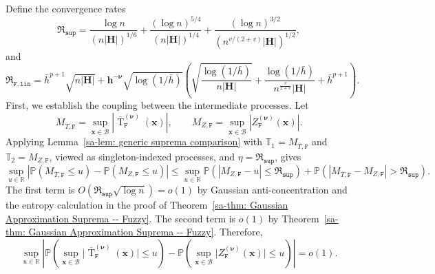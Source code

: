 \documentclass[10pt]{article}
\DeclareMathOperator{\Tstat}{T}
\renewcommand{\P}{\mathbb{P}}
\newcommand{\reals}{\mathbb{R}}
\newcommand{\bh}{\mathbf{h}}
\newcommand{\bH}{\mathbf{H}}
\newcommand{\bx}{\mathbf{x}}
\newcommand{\bnu}{\boldsymbol{\nu}}
\newcommand{\B}{\mathcal{B}}
\begin{document}
Define the convergence rates
\begin{equation*}
    \mathfrak{R}_{\mathtt{sup}}
    =
    \frac{\log n}{(n |\bH|)^{1/6}}
    + \frac{(\log n)^{5/4}}{(n |\bH|)^{1/4}}
    + \frac{(\log n)^{3/2}}{(n^{v/(2+v)} |\bH|)^{1/2}},
\end{equation*}
and
\[
    \mathfrak{R}_{\mathtt{F,lin}}
    =
    \bar{h}^{p+1}\sqrt{n |\bH|}
    + \bh^{-\bnu}\sqrt{\log(1/\bar{h})}
      \left(\sqrt{\frac{\log(1/\bar{h})}{n|\bH|}}
      +\frac{\log(1/\bar{h})}{n^{\frac{v}{2+v}}|\bH|}
      +\bar{h}^{p+1}\right).
\]
First, we establish the coupling between the intermediate processes. Let
\[
    M_{\overline T,\mathtt{F}}=\sup_{\bx\in\B}|\overline{\Tstat}_{\mathtt{F}}^{(\bnu)}(\bx)|,
    \qquad
    M_{Z,\mathtt{F}}=\sup_{\bx\in\B}|Z_{\mathtt{F}}^{(\bnu)}(\bx)|.
\]
Applying Lemma~\ref{sa-lem: generic suprema comparison} with $\mathbb{T}_1=M_{\overline T,\mathtt{F}}$ and $\mathbb{T}_2=M_{Z,\mathtt{F}}$, viewed as singleton-indexed processes, and $\eta=\mathfrak{R}_{\mathtt{sup}}$, gives
\[
    \sup_{u\in\reals}\left|\P(M_{\overline T,\mathtt{F}}\le u)-\P(M_{Z,\mathtt{F}}\le u)\right|
    \le
    \sup_{u\in\reals}\P(|M_{Z,\mathtt{F}}-u|\le \mathfrak{R}_{\mathtt{sup}})
    +\P(|M_{\overline T,\mathtt{F}}-M_{Z,\mathtt{F}}|>\mathfrak{R}_{\mathtt{sup}}).
\]
The first term is $O(\mathfrak{R}_{\mathtt{sup}}\sqrt{\log n})=o(1)$ by Gaussian anti-concentration and the entropy calculation in the proof of Theorem~\ref{sa-thm: Gaussian Approximation Suprema -- Fuzzy}. The second term is $o(1)$ by Theorem~\ref{sa-thm: Gaussian Approximation Suprema -- Fuzzy}. Therefore,
\begin{equation}\label{sa-eq: t-to-z fuzzy}
    \sup_{u \in \reals} \left| \P \left( \sup_{\bx \in \B} \big| \overline{\Tstat}_{\mathtt{F}}^{(\bnu)}(\bx) \big| \leq u \right) - \P \left( \sup_{\bx \in \B} \big| Z_{\mathtt{F}}^{(\bnu)}(\bx) \big| \leq u \right) \right| = o(1).
\end{equation}
\end{document}
